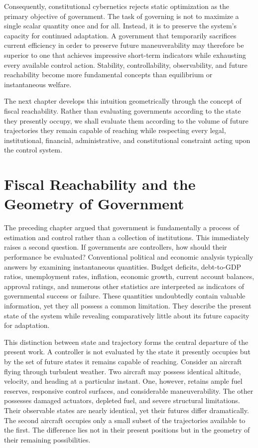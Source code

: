 \documentclass[12pt,a4paper]{article}
\begin{document}
Consequently, constitutional cybernetics rejects static optimization as the primary objective of government. The task of governing is not to maximize a single scalar quantity once and for all. Instead, it is to preserve the system's capacity for continued adaptation. A government that temporarily sacrifices current efficiency in order to preserve future maneuverability may therefore be superior to one that achieves impressive short-term indicators while exhausting every available control action. Stability, controllability, observability, and future reachability become more fundamental concepts than equilibrium or instantaneous welfare.

The next chapter develops this intuition geometrically through the concept of fiscal reachability. Rather than evaluating governments according to the state they presently occupy, we shall evaluate them according to the volume of future trajectories they remain capable of reaching while respecting every legal, institutional, financial, administrative, and constitutional constraint acting upon the control system.

\section{Fiscal Reachability and the Geometry of Government}

The preceding chapter argued that government is fundamentally a process of estimation and control rather than a collection of institutions. This immediately raises a second question. If governments are controllers, how should their performance be evaluated? Conventional political and economic analysis typically answers by examining instantaneous quantities. Budget deficits, debt-to-GDP ratios, unemployment rates, inflation, economic growth, current account balances, approval ratings, and numerous other statistics are interpreted as indicators of governmental success or failure. These quantities undoubtedly contain valuable information, yet they all possess a common limitation. They describe the present state of the system while revealing comparatively little about its future capacity for adaptation.

This distinction between state and trajectory forms the central departure of the present work. A controller is not evaluated by the state it presently occupies but by the set of future states it remains capable of reaching. Consider an aircraft flying through turbulent weather. Two aircraft may possess identical altitude, velocity, and heading at a particular instant. One, however, retains ample fuel reserves, responsive control surfaces, and considerable maneuverability. The other possesses damaged actuators, depleted fuel, and severe structural limitations. Their observable states are nearly identical, yet their futures differ dramatically. The second aircraft occupies only a small subset of the trajectories available to the first. The difference lies not in their present positions but in the geometry of their remaining possibilities.
\end{document}
